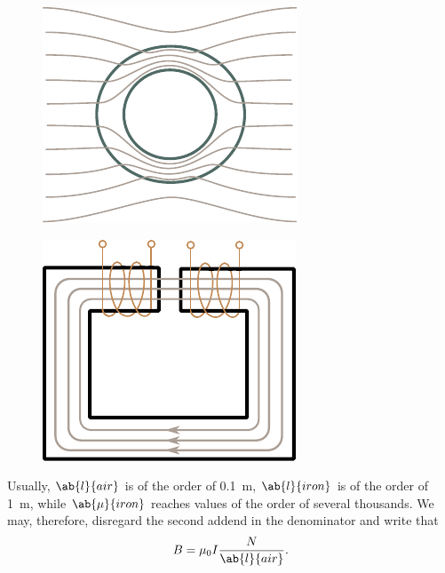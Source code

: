 \begin{figure}[!htb]
	\begin{minipage}[t]{0.48\linewidth}
		\begin{center}
			\includegraphics[scale=1]{figures/ch_07/fig_7_8.pdf}
			\caption[]{}
			\label{fig:7_8}
		\end{center}
	\end{minipage}
	\hfill{ }%
	\begin{minipage}[t]{0.48\linewidth}
		\begin{center}
			\includegraphics[scale=1]{figures/ch_07/fig_7_9.pdf}
			\caption[]{}
			\label{fig:7_9}
		\end{center}
	\end{minipage}
\vspace{-0.4cm}
\end{figure}

Usually, $\ab{l}{air}$ is of the order of \SI{0.1}{\metre}, $\ab{l}{iron}$ is of the order of \SI{1}{\metre}, while $\ab{\mu}{iron}$ reaches values of the order of several thousands.
We may, therefore, disregard the second addend in the denominator and write that
\begin{equation}\label{eq:7_38}
    B = \mu_0 I \frac{N}{\ab{l}{air}}.
\end{equation}

